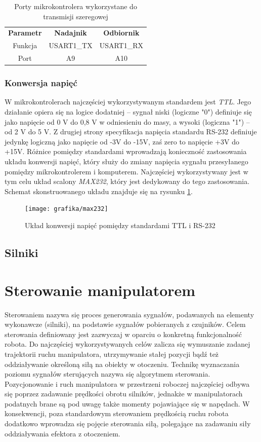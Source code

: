 \documentclass[printmode]{mgr}
\begin{document}
\begin{table}[tp]
  \caption{Porty mikrokontrolera wykorzystane do transmisji szeregowej}
  \label{tab:porty_rs232}
  \centering
  \begin{tabular}{||c|c|c||}
    \hline\hline
{\bf Parametr} & {\bf Nadajnik} & {\bf Odbiornik} \\
Funkcja & USART1\_TX & USART1\_RX \\
Port & A9 & A10\\
\hline\hline
  \end{tabular}
\end{table}

\subsection{Konwersja napięć}
W mikrokontrolerach najczęściej wykorzystywanym standardem jest \emph{TTL}. Jego działanie opiera się na logice dodatniej -- 
sygnał niski (logiczne "0") definiuje się jako napięcie od 0 V do 0,8 V w odniesieniu do masy, a wysoki (logiczna "1") -- od 2 V do 5 V.
Z drugiej strony specyfikacja napięcia standardu RS-232 definiuje jedynkę logiczną jako napięcie od -3V do -15V, zaś zero to napięcie +3V do +15V.
Różnice pomiędzy standardami wprowadzają konieczność zastosowania układu konwersji napięć, który służy do zmiany napięcia
sygnału przesyłanego pomiędzy mikrokontrolerem i komputerem. Najczęściej wykorzystywany jest w tym celu układ scalony \emph{MAX232}, który 
jest dedykowany do tego zastosowania. Schemat skonstruowanego układu znajduje się na rysunku \ref{rys:max232}.

\begin{figure}[tp]
\centering
  \texttt{[image: grafika/max232]}
  \caption{Układ konwersji napięć pomiędzy standardami TTL i RS-232}
  \label{rys:max232}  
\end{figure}

\section{Silniki}

\chapter{Sterowanie manipulatorem}
Sterowaniem nazywa się proces generowania sygnałów, podawanych na elementy wykonawcze (silniki), na podstawie sygnałów
pobieranych z czujników. Celem sterowania definiowany jest zazwyczaj w oparciu o konkretną funkcjonalność robota.
Do najczęściej wykorzystywanych celów zalicza się wymuszanie zadanej trajektorii ruchu manipulatora, 
utrzymywanie stałej pozycji bądź też
oddziaływanie określoną siłą na obiekty w otoczeniu. Technikę wyznaczania poziomu sygnałów sterujących nazywa się
algorytmem sterowania. Pozycjonowanie i ruch manipulatora w przestrzeni roboczej najczęściej odbywa się poprzez zadawanie prędkości
obrotu silników, jednakże w manipulatorach podatnych brane są pod uwagę także momenty pojawiające się w napędach. W konsekwencji, 
poza standardowym sterowaniem prędkością ruchu robota dodatkowo wprowadza się pojęcie sterowania siłą, polegające na zadawaniu
siły oddziaływania efektora z otoczeniem.
\end{document}
